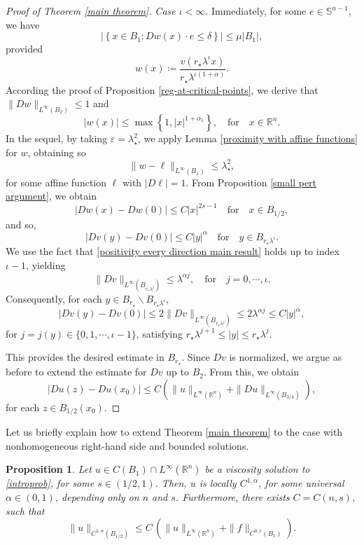 \documentclass[reqno,11pt]{amsart}
\newtheorem{proposition}{Proposition}[section]
\numberwithin{equation}{section}
\numberwithin{equation}{section}
\begin{document}
\begin{proof}[Proof of Theorem \ref{main theorem}]
\textit{Case $\iota < \infty$}. Immediately, for some $e \in \mathbb{S}^{n-1}$, we have
\begin{equation}
    \left|\left\{x \in B_1\colon Dw(x) \cdot e \leq \delta \right\} \right| \leq \mu |B_1|,
\end{equation}
provided
$$
    w(x) \coloneqq \frac{v(r_\star\lambda^{\iota}x)}{r_\star\lambda^{\iota(1+\alpha)}}.
$$
According the proof of Proposition \ref{reg-at-critical-points}, we derive that $\|Dw\|_{L^\infty(B_2)} \leq 1$ and
$$
    |w(x)| \leq \max\left\{1,|x|^{1+\alpha_1} \right\}, \quad \mbox{for} \quad x \in \mathbb{R}^n.
$$
In the sequel, by taking $\varepsilon = \lambda_\star^{2}$, we apply Lemma \ref{proximity with affine functions} for $w$, obtaining so
$$
    \|w - \ell\|_{L^\infty(B_1)} \leq \lambda_\star^{2},
$$
for some affine function $\ell$ with $|D\ell| = 1$. From Proposition \ref{small pert argument}, we obtain
$$
    |Dw(x) - Dw(0)| \leq C|x|^{2s-1} \quad \mbox{for} \quad x \in B_{1/2},
$$
and so,
\begin{equation*}
|Dv(y) - Dv(0)| \leq C|y|^\alpha \quad \mbox{for} \quad y \in B_{ r_\star \lambda^{\iota}}.
\end{equation*}
We use the fact that \eqref{positivity every direction main result} holds up to index $\iota - 1$, yielding
$$
    \|Dv\|_{L^\infty\left(B_{r_\star \lambda^j}\right)} \leq \lambda^{\alpha j}, \quad \mbox{for} \quad j = 0, \cdots, \iota.
$$
Consequently, for each $y \in B_{r_\star} \backslash B_{r_\star \lambda^\iota}$, 
$$
    |Dv(y) - Dv(0)| \leq 2\|Dv\|_{L^\infty(B_{r_\star \lambda^j})} \leq 2 \lambda^{\alpha j} \leq C|y|^\alpha,
$$
for $j=j(y) \in \{0,1,\cdots, \iota - 1\}$, satisfying $r_\star \lambda^{j+1} \leq |y| \leq r_\star \lambda^{j}$.

This provides the desired estimate in $B_{r_\star}$. Since $Dv$ is normalized, we argue as before to extend the estimate for $Dv$ up to $B_2$. From this, we obtain
$$
    |Du(z) - Du(x_0)| \leq C\left( \|u\|_{L^\infty(\mathbb{R}^n)} + \|Du\|_{L^\infty(B_{3/4})}\right),
$$
 for each $z \in B_{1/2}(x_0)$.
\end{proof}

Let us briefly explain how to extend Theorem \ref{main theorem} to the case with nonhomogeneous right-hand side and bounded solutions.

\begin{proposition}\label{nonhomg case}
Let $u \in C(B_1) \cap L^\infty(\mathbb{R}^n)$ be a viscosity solution to \eqref{introprob}, for some $s\in (1/2,1)$. Then, $u$ is locally $C^{1,\alpha}$, for some universal $\alpha\in (0,1)$, depending only on $n$ and $s$. Furthermore, there exists $C = C(n,s)$, such that
$$
    \|u\|_{C^{1,\alpha}(B_{1/2})} \leq C\,\left(\|u\|_{L^\infty(\mathbb{R}^n)} + \|f\|_{C^{0,1}(B_1)}\right).
$$   
\end{proposition}
\end{document}
